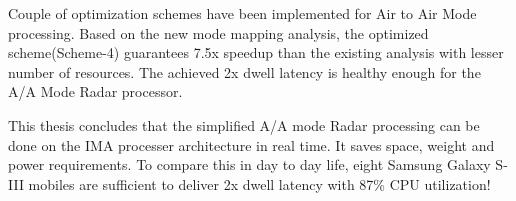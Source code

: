 Couple of optimization schemes have been implemented for Air to Air Mode processing. Based on the new mode mapping analysis, the optimized scheme(Scheme-4) guarantees 7.5x speedup than the existing analysis with lesser number of resources. The achieved 2x dwell latency is healthy enough for the A/A Mode Radar processor. \vspace*{0.2cm}

This thesis concludes that the simplified A/A mode Radar processing can be done on the IMA processer architecture in real time. It saves space, weight and power requirements. To compare this in day to day life, eight Samsung Galaxy S-III mobiles are sufficient to deliver 2x dwell latency with 87\% CPU utilization!

